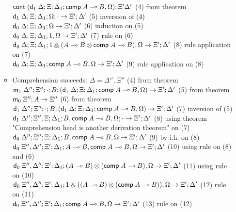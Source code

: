 \documentclass[9pt]{article}
\begin{document}
\begin{itemize}
\begin{itemize}
$\mathsf{cont} \; (\mathsf{d}_1 \; \Delta; \Xi; \Delta_1; \mathsf{comp} \; A \multimap B, \Omega); \Xi' \Delta'$ \hfill (4) from theorem \\
$\mathsf{d}_1 \; \Delta; \Xi; \Delta_1; \Omega; \cdot \rightarrow \Xi'; \Delta'$ \hfill (5) inversion of (4) \\
$\mathsf{d}_0 \; \Delta; \Xi; \Delta_1; \Omega \rightarrow \Xi'; \Delta'$ \hfill (6) induction on (5) \\
$\mathsf{d}_0 \; \Delta; \Xi; \Delta_1; 1, \Omega \rightarrow \Xi';\Delta'$ \hfill (7) rule on (6) \\
$\mathsf{d}_0 \; \Delta; \Xi; \Delta_1; 1 \mathbin{\binampersand} (A \multimap B \otimes \mathsf{comp} \; A \multimap B), \Omega \rightarrow \Xi'; \Delta'$ \hfill (8) rule application on (7) \\
$\mathsf{d}_0 \; \Delta; \Xi; \Delta_1; \mathsf{comp} \; A \multimap B, \Omega \rightarrow \Xi'; \Delta'$ (9) rule application on (8) \\
\item Comprehension succeeds:
$\Delta = \Delta'', \Xi''$ \hfill (4) from theorem \\
$\mathsf{m}_1 \; \Delta''; \Xi''; \cdot ; B; (\mathsf{d}_1 \; \Delta; \Xi; \Delta_1; \mathsf{comp} \; A \multimap B, \Omega) \rightarrow \Xi'; \Delta'$ \hfill (5) from theorem \\
$\mathsf{m}_0 \; \Xi''; A \rightarrow \Xi''$ \hfill (6) from theorem \\
$\mathsf{d}_1 \; \Delta''; \Xi''; \cdot; B; (\mathsf{d}_1 \; \Delta; \Xi; \Delta_1; \mathsf{comp} \; A \multimap B, \Omega) \rightarrow \Xi'; \Delta'$ \hfill (7) inversion of (5) \\
$\mathsf{d}_1 \; \Delta''; \Xi'', \Xi; \Delta_1; B, \mathsf{comp} \; A \multimap B, \Omega; \cdot \rightarrow \Xi'; \Delta'$ \hfill (8) using theorem "Comprehension head is another derivation theorem" on (7) \\
$\mathsf{d}_0 \; \Delta''; \Xi''; \Xi; \Delta_1; B, \mathsf{comp} \; A \multimap B, \Omega \rightarrow \Xi'; \Delta'$ \hfill (9) by i.h. on (8) \\
$\mathsf{d}_0 \; \Xi'', \Delta''; \Xi'; \Delta_1; A \multimap B, \mathsf{comp} \; A \multimap B, \Omega \rightarrow \Xi'; \Delta'$ \hfill (10) using rule on (8) and (6) \\
$\mathsf{d}_0 \; \Xi'', \Delta''; \Xi'; \Delta_1; (A \multimap B) \otimes (\mathsf{comp} \; A \multimap B), \Omega \rightarrow \Xi'; \Delta'$ \hfill (11) using rule on (10) \\
$\mathsf{d}_0 \; \Xi'', \Delta''; \Xi'; \Delta_1; 1 \mathbin{\binampersand} ((A \multimap B) \otimes (\mathsf{comp} \; A \multimap B)), \Omega \rightarrow \Xi'; \Delta'$ \hfill (12) rule on (11) \\
$\mathsf{d}_0 \; \Xi'', \Delta''; \Xi'; \Delta_1; \mathsf{comp} \; A \multimap B, \Omega \rightarrow \Xi'; \Delta'$ \hfill (13) rule on (12) \\

\end{itemize}
\end{itemize}
\end{document}
